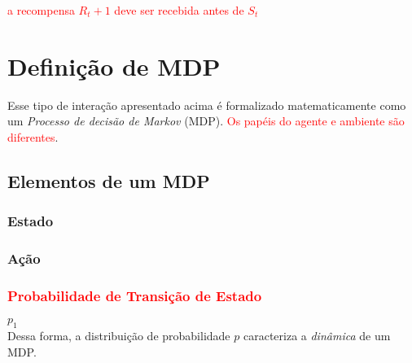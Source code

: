 \documentclass{article}
\begin{document}
            \textcolor{red}{a recompensa $R_t+1$ deve ser recebida antes de $S_t$}
        
            \begin{center}
                \rlinteraction
            \end{center}
            
    \section{Definição de MDP}
    
        Esse tipo de interação apresentado acima é formalizado matematicamente como um \emph{Processo de decisão de Markov} (MDP). \textcolor{red}{Os papéis do agente e ambiente são diferentes}.
    
        \subsection{Elementos de um MDP}
    
            \subsubsection{Estado}
            
                
            \subsubsection{Ação}
            
                
            \subsubsection{\textcolor{red}{Probabilidade de Transição de Estado}}
            
                $p_1$ \\
            
                Dessa forma, a distribuição de probabilidade $p$ caracteriza a \emph{dinâmica} de um MDP.
            
\end{document}
